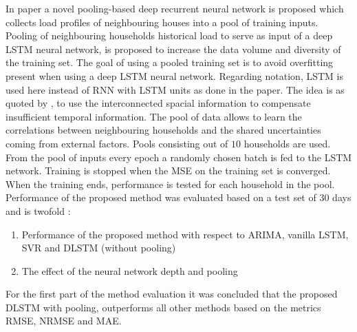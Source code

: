 In paper \cite{Shi2018} a novel pooling-based deep recurrent neural network is proposed which collects load profiles of neighbouring houses into a pool of training inputs. Pooling of neighbouring households historical load to serve as input of a deep LSTM neural network, is proposed to increase the data volume and diversity of the training set. The goal of using a pooled training set is to avoid overfitting present when using a deep LSTM neural network. Regarding notation, LSTM is used here instead of RNN with LSTM units as done in the paper. The idea is as quoted by \cite{Shi2018}, to use the interconnected spacial information to compensate insufficient temporal information. The pool of data allows to learn the correlations between neighbouring households and the shared uncertainties coming from external factors. Pools consisting out of $ 10 $ households are used. From the pool of inputs every epoch a randomly chosen batch is fed to the LSTM network. Training is stopped when the MSE on the training set is converged. When the training ends, performance is tested for each household in the pool.\\


Performance of the proposed method was evaluated based on a test set of $ 30 $ days and is twofold : 
\begin{enumerate}
	\item Performance of the proposed method with respect to ARIMA, vanilla LSTM, SVR and DLSTM (without pooling)
	\item The effect of the neural network depth and pooling
\end{enumerate}

For the first part of the method evaluation it was concluded that the proposed DLSTM with pooling, outperforms all other methods based on the metrics RMSE, NRMSE and MAE.


